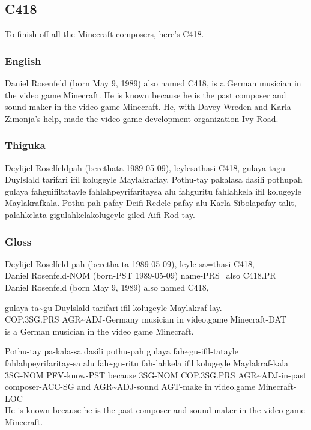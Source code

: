 \newpage

\subsection{C418}
To finish off all the Minecraft composers, here's C418.

\subsubsection*{English}
Daniel Rosenfeld (born May 9, 1989) also named C418, is a German musician in the video game Minecraft.
He is known because he is the past composer and sound maker in the video game Minecraft.
He, with Davey Wreden and Karla Zimonja's help, made the video game development organization Ivy Road.

\subsubsection*{Thiguka}
Deylijel Roselfeldpah (berethata 1989-05-09), leylesathasi C418, gulaya tagu-Duylslald tarifari ifil kolugeyle Maylakraflay.
Pothu-tay pakalasa dasili pothupah gulaya fahguifiltatayle fahlahpeyrifaritaysa alu fahguritu fahlahkela ifil kolugeyle Maylakrafkala.
Pothu-pah pafay Deifi Redele-pafay alu Karla Sibolapafay talit, palahkelata gigulahkelakolugeyle giled Aifi Rod-tay.

\subsubsection*{Gloss}

\begin{exe}
    \ex{} \gll{}Deylijel Roselfeld-pah (beretha-ta 1989-05-09), leyle-sa=thasi C418,\\
                Daniel Rosenfeld-NOM (born-PST 1989-05-09) name-PRS=also C418.PR\\
          \glt{}Daniel Rosenfeld (born May 9, 1989) also named C418,
\end{exe}

\begin{exe}
    \ex{} \gll{}gulaya ta\~{}gu-Duylslald tarifari ifil kolugeyle Maylakraf-lay.\\
                COP.3SG.PRS AGR\~{}ADJ-Germany musician in video.game Minecraft-DAT\\
          \glt{}is a German musician in the video game Minecraft.
\end{exe}

\begin{exe}
    \ex{} \gll{}Pothu-tay pa-kala-sa dasili pothu-pah gulaya fah\~{}gu-ifil-tatayle fahlahpeyrifaritay-sa alu fah\~{}gu-ritu fah-lahkela ifil kolugeyle Maylakraf-kala\\
                3SG-NOM PFV-know-PST because 3SG-NOM COP.3SG.PRS AGR\~{}ADJ-in-past composer-ACC-SG and AGR\~{}ADJ-sound AGT-make in video.game Minecraft-LOC\\
          \glt{}He is known because he is the past composer and sound maker in the video game Minecraft.
\end{exe}


